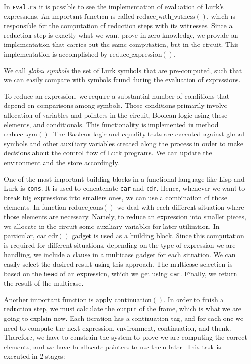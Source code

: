 \documentclass[10pt, english]{article}
\newcommand{\redexp}{\mathrm{reduce\_expression}}
\newcommand{\redwithwit}{\mathrm{reduce\_with\_witness}}
\newcommand{\redcons}{\mathrm{reduce\_cons}}
\newcommand{\redsym}{\mathrm{reduce\_sym}}
\newcommand{\applycont}{\mathrm{apply\_continuation}}
\newcommand{\carcdr}{\mathrm{car\_cdr}}
\newcommand{\makethunk}{\mathrm{make\_thunk}}
\begin{document}
In \verb|eval.rs| it is possible to see the implementation of evaluation of Lurk's expressions. An important function is called $\redwithwit()$, which is responsible for the computation of reduction steps with its witnesses. Since a reduction step is exactly what we want prove in zero-knowledge, we provide an implementation that carries out the same computation, but in the circuit. This implementation is accomplished by $\redexp()$. 

We call \textit{global symbols} the set of Lurk symbols that are pre-computed, such that we can easily compare with symbols found during the evaluation of expressions.

To reduce an expression, we require a substantial number of conditions that depend on comparisons among symbols. Those conditions primarily involve allocation of variables and pointers in the circuit, Boolean logic using those elements, and conditionals. This functionality is implemented in method $\redsym()$. The Boolean logic and equality tests are executed against global symbols and other auxiliary variables created along the process in order to make decisions about the control flow of Lurk programs. We can update the environment and the store accordingly.

One of the most important building blocks in a functional language like Lisp and Lurk is \verb|cons|. It is used to concatenate \verb|car| and \verb|cdr|. Hence, whenever we want to break big expressions into smallers ones, we can use a combination of those elements. In function $\redcons()$ we deal with each different situation where those elements are necessary. Namely, to reduce an expression into smaller pieces, we allocate in the circuit some auxiliary variables for later utilization. In particular, $\carcdr()$ gadget is used as a building block. Since this computation is required for different situations, depending on the type of expression we are handling, we include a clause in a multicase gadget for each situation. We can easily select the desired result using this approach. The multicase selection is based on the \verb|head| of an expression, which we get using \verb|car|. Finally, we return the result of the multicase.



Another important function is $\applycont()$. In order to finish a reduction step, we must calculate the output of the frame, which is what we are going to explain now. Each iteration has a continuation tag, and for each one we need to compute the next expression, environment, continuation, and thunk. Therefore, we have to constrain the system to prove we are computing the correct elements, and we have to allocate pointers to use them later. This task is executed in 2 stages:
\end{document}
